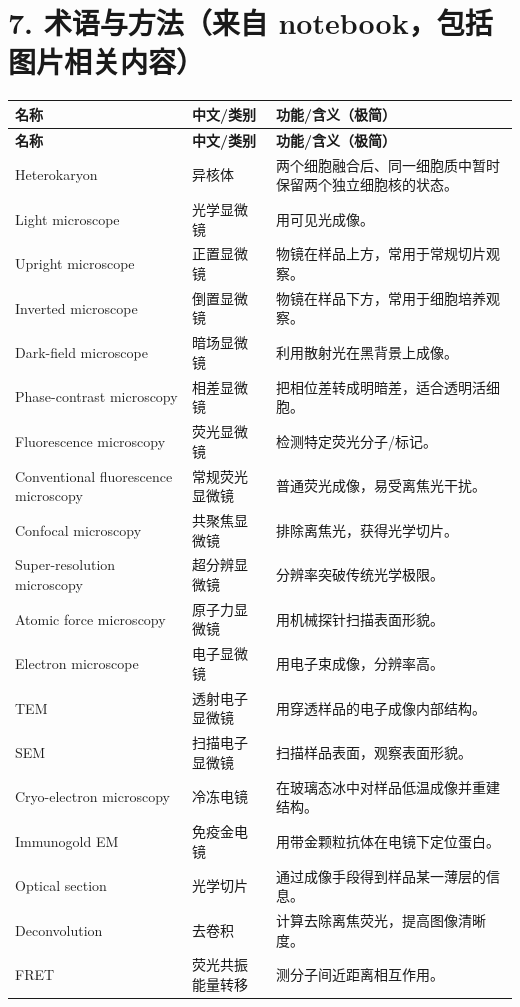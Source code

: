 \documentclass[11pt,fontset=none]{ctexart}
\begin{document}
\section*{7. 术语与方法（来自 notebook，包括图片相关内容）}
\begin{longtable}{L{3.2cm} L{3.8cm} L{8.5cm}}
\toprule
\textbf{名称} & \textbf{中文/类别} & \textbf{功能/含义（极简）} \\
\midrule
\endfirsthead
\toprule
\textbf{名称} & \textbf{中文/类别} & \textbf{功能/含义（极简）} \\
\midrule
\endhead
\bottomrule
\endfoot
Heterokaryon & 异核体 & 两个细胞融合后、同一细胞质中暂时保留两个独立细胞核的状态。 \\
Light microscope & 光学显微镜 & 用可见光成像。 \\
Upright microscope & 正置显微镜 & 物镜在样品上方，常用于常规切片观察。 \\
Inverted microscope & 倒置显微镜 & 物镜在样品下方，常用于细胞培养观察。 \\
Dark-field microscope & 暗场显微镜 & 利用散射光在黑背景上成像。 \\
Phase-contrast microscopy & 相差显微镜 & 把相位差转成明暗差，适合透明活细胞。 \\
Fluorescence microscopy & 荧光显微镜 & 检测特定荧光分子/标记。 \\
Conventional fluorescence microscopy & 常规荧光显微镜 & 普通荧光成像，易受离焦光干扰。 \\
Confocal microscopy & 共聚焦显微镜 & 排除离焦光，获得光学切片。 \\
Super-resolution microscopy & 超分辨显微镜 & 分辨率突破传统光学极限。 \\
Atomic force microscopy & 原子力显微镜 & 用机械探针扫描表面形貌。 \\
Electron microscope & 电子显微镜 & 用电子束成像，分辨率高。 \\
TEM & 透射电子显微镜 & 用穿透样品的电子成像内部结构。 \\
SEM & 扫描电子显微镜 & 扫描样品表面，观察表面形貌。 \\
Cryo-electron microscopy & 冷冻电镜 & 在玻璃态冰中对样品低温成像并重建结构。 \\
Immunogold EM & 免疫金电镜 & 用带金颗粒抗体在电镜下定位蛋白。 \\
Optical section & 光学切片 & 通过成像手段得到样品某一薄层的信息。 \\
Deconvolution & 去卷积 & 计算去除离焦荧光，提高图像清晰度。 \\
FRET & 荧光共振能量转移 & 测分子间近距离相互作用。 \\

\end{longtable}
\end{document}
